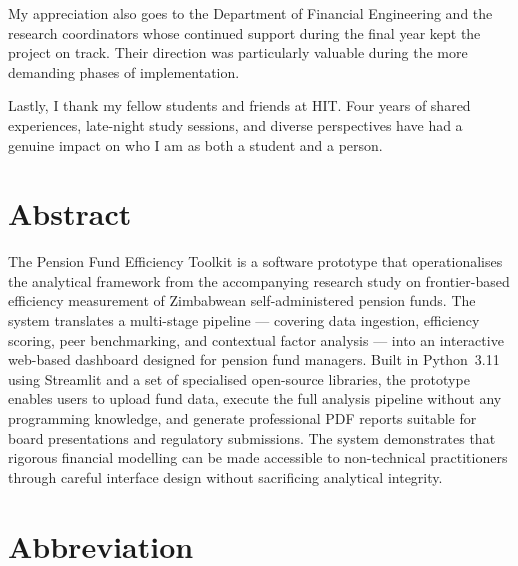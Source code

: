 \documentclass[12pt,a4paper]{report}
\begin{document}
My appreciation also goes to the Department of Financial Engineering and the research
coordinators whose continued support during the final year kept the project on track. Their
direction was particularly valuable during the more demanding phases of implementation.

Lastly, I thank my fellow students and friends at HIT. Four years of shared experiences,
late-night study sessions, and diverse perspectives have had a genuine impact on who I am
as both a student and a person.
\newpage

\tableofcontents
\newpage

\listoffigures
\newpage

\listoftables
\newpage

\chapter*{Abstract}

The Pension Fund Efficiency Toolkit is a software prototype that operationalises the
analytical framework from the accompanying research study on frontier-based efficiency
measurement of Zimbabwean self-administered pension funds. The system translates a
multi-stage pipeline --- covering data ingestion, efficiency scoring, peer benchmarking,
and contextual factor analysis --- into an interactive web-based dashboard designed for
pension fund managers. Built in Python~3.11 using Streamlit and a set of specialised
open-source libraries, the prototype enables users to upload fund data, execute the full
analysis pipeline without any programming knowledge, and generate professional PDF reports
suitable for board presentations and regulatory submissions. The system demonstrates that
rigorous financial modelling can be made accessible to non-technical practitioners through
careful interface design without sacrificing analytical integrity.
\newpage

\chapter*{Abbreviation}
\end{document}
